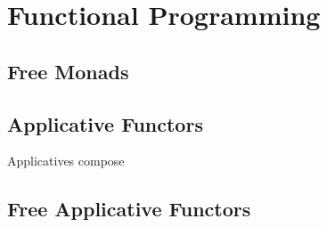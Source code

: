 \section{Functional Programming}
\label{sec:funct-progr}

\subsection{Free Monads}
\label{sec:free-monads}

\cite{Haxl}
\cite{DataTypesALaCarte}

\subsection{Applicative Functors}
\label{sec:applicative-functors}

Applicatives compose \cite{EssenceIterator}

\subsection{Free Applicative Functors}
\label{sec:free-appl-funct}

\cite{FreeApplicatives}

